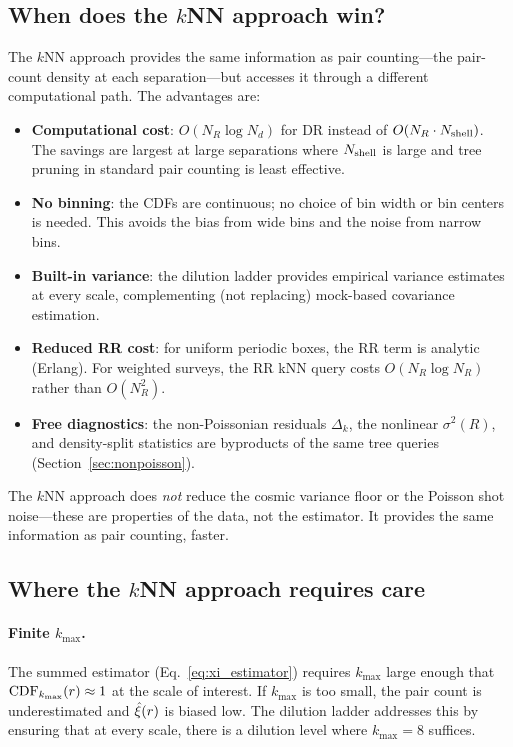 \subsection{When does the $k$NN approach win?}
\label{sec:when_wins}

The $k$NN approach provides the same information as pair counting---the pair-count density at each separation---but accesses it through a different computational path.  The advantages are:
\begin{itemize}[nosep]
  \item \textbf{Computational cost}: $O(N_R \log N_d)$ for DR instead of $O(N_R \cdot N_{\rm shell})$.  The savings are largest at large separations where $N_{\rm shell}$ is large and tree pruning in standard pair counting is least effective.
  \item \textbf{No binning}: the CDFs are continuous; no choice of bin width or bin centers is needed.  This avoids the bias from wide bins and the noise from narrow bins.
  \item \textbf{Built-in variance}: the dilution ladder provides empirical variance estimates at every scale, complementing (not replacing) mock-based covariance estimation.
  \item \textbf{Reduced RR cost}: for uniform periodic boxes, the RR term is analytic (Erlang).  For weighted surveys, the RR kNN query costs $O(N_R \log N_R)$ rather than $O(N_R^2)$.
  \item \textbf{Free diagnostics}: the non-Poissonian residuals $\Delta_k$, the nonlinear $\sigma^2(R)$, and density-split statistics are byproducts of the same tree queries (Section~\ref{sec:nonpoisson}).
\end{itemize}

The $k$NN approach does \emph{not} reduce the cosmic variance floor or the Poisson shot noise---these are properties of the data, not the estimator.  It provides the same information as pair counting, faster.

\subsection{Where the $k$NN approach requires care}
\label{sec:care}

\paragraph{Finite $k_{\max}$.}  The summed estimator (Eq.~\ref{eq:xi_estimator}) requires $k_{\max}$ large enough that $\mathrm{CDF}_{k_{\max}}(r) \approx 1$ at the scale of interest.  If $k_{\max}$ is too small, the pair count is underestimated and $\hat{\xi}(r)$ is biased low.  The dilution ladder addresses this by ensuring that at every scale, there is a dilution level where $k_{\max} = 8$ suffices.

